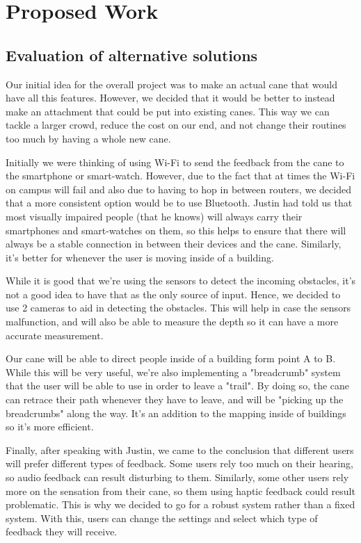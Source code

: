 \documentclass[letterpaper,12pt]{article}
\begin{document}
\section{Proposed Work}
\subsection{Evaluation of alternative solutions}
Our initial idea for the overall project was to make an actual cane that would have all this features. However, we decided that it would be better to instead make an attachment that could be put into existing canes. This way we can tackle a larger crowd, reduce the cost on our end, and not change their routines too much by having a whole new cane.\par

Initially we were thinking of using Wi-Fi to send the feedback from the cane to the smartphone or smart-watch. However, due to the fact that at times the Wi-Fi on campus will fail and also due to having to hop in between routers, we decided that a more consistent option would be to use Bluetooth. Justin had told us that most visually impaired people (that he knows) will always carry their smartphones and smart-watches on them, so this helps to ensure that there will always be a stable connection in between their devices and the cane. Similarly, it's better for whenever the user is moving inside of a building.\par

While it is good that we're using the sensors to detect the incoming obstacles, it's not a good idea to have that as the only source of input. Hence, we decided to use 2 cameras to aid in detecting the obstacles. This will help in case the sensors malfunction, and will also be able to measure the depth so it can have a more accurate measurement.\par

Our cane will be able to direct people inside of a building form point A to B. While this will be very useful, we're also implementing a "breadcrumb" system that the user will be able to use in order to leave a "trail". By doing so, the cane can retrace their path whenever they have to leave, and will be "picking up the breadcrumbs" along the way. It's an addition to the mapping inside of buildings so it's more efficient.\par

Finally, after speaking with Justin, we came to the conclusion that different users will prefer different types of feedback. Some users rely too much on their hearing, so audio feedback can result disturbing to them. Similarly, some other users rely more on the sensation from their cane, so them using haptic feedback could result problematic. This is why we decided to go for a robust system rather than a fixed system. With this, users can change the settings and select which type of feedback they will receive.
\end{document}
